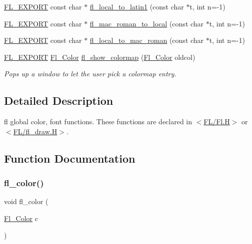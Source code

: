 \begin{DoxyCompactItemize}
\hyperlink{_fl___export_8_h_aa9ba29a18aee9d738370a06eeb4470fc}{F\+L\+\_\+\+E\+X\+P\+O\+RT} const char $\ast$ \hyperlink{group__fl__attributes_gab8a87db2004482954fc81a8a41c80c21}{fl\+\_\+local\+\_\+to\+\_\+latin1} (const char $\ast$t, int n=-\/1)
\item 
\hyperlink{_fl___export_8_h_aa9ba29a18aee9d738370a06eeb4470fc}{F\+L\+\_\+\+E\+X\+P\+O\+RT} const char $\ast$ \hyperlink{group__fl__attributes_ga0d34a59a5d378d83e9b41887b8145481}{fl\+\_\+mac\+\_\+roman\+\_\+to\+\_\+local} (const char $\ast$t, int n=-\/1)
\item 
\hyperlink{_fl___export_8_h_aa9ba29a18aee9d738370a06eeb4470fc}{F\+L\+\_\+\+E\+X\+P\+O\+RT} const char $\ast$ \hyperlink{group__fl__attributes_gaac5f521ee634fdd70f6e286479ebab32}{fl\+\_\+local\+\_\+to\+\_\+mac\+\_\+roman} (const char $\ast$t, int n=-\/1)
\item 
\hyperlink{_fl___export_8_h_aa9ba29a18aee9d738370a06eeb4470fc}{F\+L\+\_\+\+E\+X\+P\+O\+RT} \hyperlink{_enumerations_8_h_a8b762953646f8abee866061f1af78a6a}{Fl\+\_\+\+Color} \hyperlink{group__fl__attributes_ga497a7e059e9f5c89feed24ab0b1338f2}{fl\+\_\+show\+\_\+colormap} (\hyperlink{_enumerations_8_h_a8b762953646f8abee866061f1af78a6a}{Fl\+\_\+\+Color} oldcol)
\begin{DoxyCompactList}\small\item\em Pops up a window to let the user pick a colormap entry. \end{DoxyCompactList}\end{DoxyCompactItemize}


\subsection{Detailed Description}
fl global color, font functions. These functions are declared in $<$\hyperlink{_fl_8_h}{F\+L/\+Fl.\+H}$>$ or $<$\hyperlink{fl__draw_8_h}{F\+L/fl\+\_\+draw.\+H}$>$. 

\subsection{Function Documentation}
\mbox{\label{group__fl__attributes_ga974e9f64959aa83cf6f0a36d3f0105aa}} 
\subsubsection{\texorpdfstring{fl\+\_\+color()}{fl\_color()}\hspace{0.1cm}{\footnotesize\ttfamily [1/4]}}
{\footnotesize\ttfamily void fl\+\_\+color (\begin{DoxyParamCaption}\item[{\hyperlink{_enumerations_8_h_a8b762953646f8abee866061f1af78a6a}{Fl\+\_\+\+Color}}]{c }\end{DoxyParamCaption})\hspace{0.3cm}{\ttfamily [inline]}}

